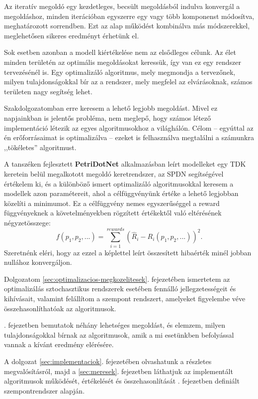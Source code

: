 Az iteratív megoldó egy kezdetleges, becsült megoldásból indulva konvergál a megoldáshoz, minden iterációban egyszerre egy vagy több komponenst módosítva, meghatározott sorrendben. Ezt az alap működést kombinálva más módszerekkel, meglehetősen sikeres eredményt érhetünk el.\cite{SolverKonyv}

Sok esetben azonban a modell kiértékelése nem az elsődleges célunk. Az élet minden területén az optimális megoldásokat keressük, így van ez egy rendszer tervezésénél is. Egy optimalizáló algoritmus, mely megmondja a tervezőnek, milyen tulajdonságokkal bír az a rendszer, mely megfelel az elvárásoknak, számos területen nagy segítség lehet.

Szakdolgozatomban erre keresem a lehető legjobb megoldást. Mivel ez napjainkban is jelentős probléma, nem meglepő, hogy számos létező implementáció létezik az egyes algoritmusokhoz a világhálón. Célom -- egyúttal az én erőforrásaimat is optimalizálva -- ezeket is felhasználva megtalálni a számunkra ,,tökéletes'' algoritmust.

A tanszéken fejlesztett \textbf{PetriDotNet} alkalmazásban leírt modelleket egy TDK keretein belül megalkotott megoldó keretrendszer, az SPDN\cite{SpdnTDK} segítségével értékelem ki, és a különböző ismert optimalizáló algoritmusokkal keresem a modellek azon paramétereit, ahol a célfüggvényünk értéke a lehető legjobban közelíti a minimumot. Ez a célfüggvény nemes egyszerűséggel a reward függvényeknek a követelményekben rögzített értékektől való eltérésének négyzetösszege:
\begin{equation}
	\label{eq:celfgv}
	f(p_1,p_2,...)=\sum_{i=1}^{rewards}\left( \hat{R}_i-R_i(p_1,p_2,...)\right) ^2.
\end{equation}
Szeretnénk eléri, hogy az ezzel a képlettel leírt összesített hibaérték minél jobban nullához konvergáljon.

Dolgozatom \ref{sec:optimalizacios-megkozelitesek}. fejezetében ismertetem az optimalizálás sztochasztikus rendszerek esetében fennálló jellegzetességeit és kihívásait, valamint felállítom a szempont rendszert, amelyeket figyelembe véve összehasonlíthatóak az algoritmusok.

. fejezetben bemutatok néhány lehetséges megoldást, és elemzem, milyen tulajdonságokkal bírnak az algoritmusok, amik a mi esetünkben befolyással vannak a kívánt eredmény elérésére.

A dolgozat \ref{sec:implementaciok}. fejezetében olvashatunk a részletes megvalósításról, majd a \ref{sec:meresek}. fejezetben láthatjuk az implementált algoritmusok működését, értékelését és összehasonlítását . fejezetben definiált szempontrendszer alapján.